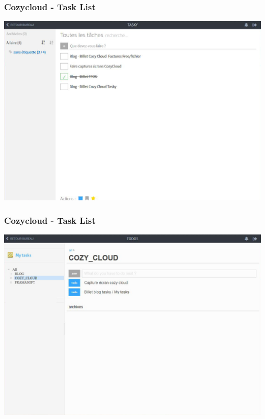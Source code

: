 \documentclass{beamer}
\begin{document}
\begin{frame}
\frametitle{Cozycloud - Task List}
\includegraphics[scale=0.3] {./CozyCloud/CozyCloud_Tasky.jpg}
\end{frame}
\begin{frame}
\frametitle{Cozycloud - Task List}
\includegraphics[scale=0.3] {./CozyCloud/CozyCloud_Todos.jpg}
\end{frame}
\end{document}
